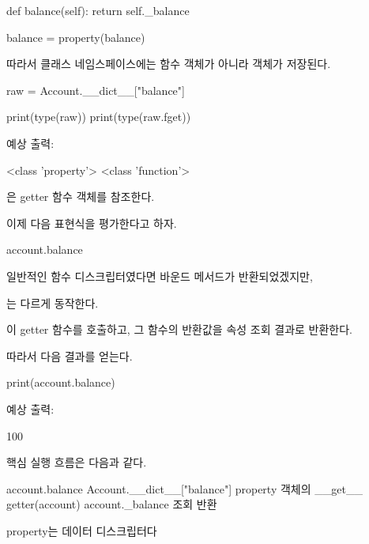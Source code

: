 \begin{dhkcode}
def balance(self):
    return self._balance

balance = property(balance)
\end{dhkcode}

따라서 클래스 네임스페이스에는 함수 객체가 아니라  객체가 저장된다.

\begin{dhkcode}
raw = Account.__dict__["balance"]

print(type(raw))
print(type(raw.fget))
\end{dhkcode}

예상 출력:

\begin{dhkzsh}
<class 'property'>
<class 'function'>
\end{dhkzsh}

은 getter 함수 객체를 참조한다.

이제 다음 표현식을 평가한다고 하자.

\begin{dhkcode}
account.balance
\end{dhkcode}

일반적인 함수 디스크립터였다면 바운드 메서드가 반환되었겠지만, 

는 다르게 동작한다.

이 getter 함수를 호출하고, 그 함수의 반환값을 속성 조회 결과로 반환한다.

따라서 다음 결과를 얻는다.

\begin{dhkcode}
print(account.balance)
\end{dhkcode}

예상 출력:

\begin{dhkzsh}
100
\end{dhkzsh}

핵심 실행 흐름은 다음과 같다.

\begin{dhksmry}[centered]
account.balance
\da
Account.__dict__["balance"]
\da
property 객체의 __get__
\da
getter(account)
\da
account._balance 조회
 반환
\end{dhksmry}

\begin{dhknote}
\begin{dhksmry}[centered]
property는 데이터 디스크립터다
\end{dhksmry}
\end{dhknote}

